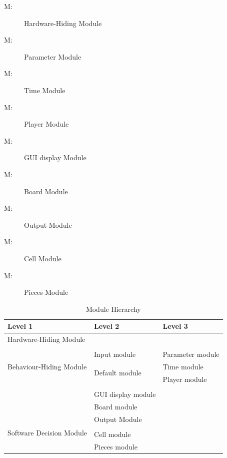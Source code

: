\documentclass[12pt, titlepage]{article}
\newcounter{mnum}
\newcommand{\mthemnum}{M\themnum}
\begin{document}
\begin{description}
\item [ \mthemnum \label{mHH}:] Hardware-Hiding Module
\item [ \mthemnum \label{mPAR}:] Parameter Module
\item [ \mthemnum \label{mT}:] Time Module
\item [ \mthemnum \label{mP}:] Player Module
\item [ \mthemnum \label{mGUI}:] GUI display Module
\item [ \mthemnum \label{mB}:] Board Module
\item [ \mthemnum \label{mOUT}:] Output Module
\item [ \mthemnum \label{mC}:] Cell Module
\item [ \mthemnum \label{mPI}:] Pieces Module
\end{description}


\begin{table}[h!]
\centering
\begin{tabular}{p{} p{} p{}}
\toprule
\textbf{Level 1} & \textbf{Level 2} & \textbf{Level 3} \\
\midrule

{Hardware-Hiding Module} \\
\midrule

\multirow{5}{0.3\textwidth}{Behaviour-Hiding Module}\\

& \multirow{1}{0.3\textwidth}{Input module}&{Parameter module}\\
& \multirow{2}{0.3\textwidth}{Default module}&{Time module}\\
& \multirow{2}{0.3\textwidth}{}&{Player module}\\\\
& {GUI display module}\\
& {Board module}\\
& {Output Module} \\
\midrule


\multirow{2}{0.3\textwidth}{Software Decision Module}\\
& Cell module\\
& Pieces module\\
\bottomrule

\end{tabular}
\caption{Module Hierarchy}
\label{TblMH}
\end{table}
\end{document}
